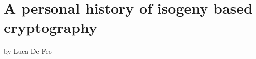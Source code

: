 \documentclass[10pt]{article}
\theoremstyle{plain}
\theoremstyle{definition}
\def\F{\ensuremath{\mathbb{F}}}
\newcommand{\bl}[1]{\textcolor{blue}{#1}}
\newcommand{\rd}[1]{\textcolor{red}{#1}}
\begin{document}
\begin{comment}
\begin{figure}
  \centering
  \begin{tabular}{l *{2}{p{32ex}<{\centering}}}
    \hline
    Public parameters & \multicolumn{2}{l}{Primes $ℓ_A,ℓ_B$, and a prime $p=ℓ_A^{e_A}ℓ_B^{e_B}f∓1$,}\\
                      & \multicolumn{2}{l}{A supersingular elliptic curve $E$ over $\F_{p^2}$ of order $(p±1)^2$,}\\
                      & \multicolumn{2}{l}{A basis $〈P_A,Q_A〉$ of $E[ℓ_A^{e_A}]$,}\\
                      & \multicolumn{2}{l}{A basis $〈P_B,Q_B〉$ of $E[ℓ_B^{e_B}]$,}\\
    \hline
                      & {\bf Alice} & {\bf Bob}\\
    \hline
    Pick random secret & $A=[m_A]P_A+[n_A]Q_A$ & $B=[m_B]P_B+[n_B]Q_B$\\[1ex]
    Compute secret isogeny & $α:E\to E_A=E/〈A〉$ & $β:E\to E_B=E/〈B〉$\\[1ex]
    Exchange data &  \hfill $E_A,α(P_B),α(Q_B) \longrightarrow$ & $\longleftarrow E_B,β(P_A),β(Q_A)$ \hfill\strut \\[1ex]
    Compute shared secret & $E/〈A,B〉 = E_B/〈β(A)〉$ & $E/〈A,B〉 = E_A/〈α(B)〉$
  \end{tabular}
  
  \caption{Supersingular Isogeny Diffie-Hellman key exchange protocol.}
  \label{fig:sidh-prot}
\end{figure}

\begin{figure}
  \centering
  \begin{tikzpicture}
    \node[matrix of nodes, ampersand replacement=\&, column sep=4mm, row sep=2cm] (diagram) {
      \& |(1)| $E$ \\
      |(a)| \parbox{1.5cm}{$E/〈\bl{A}〉$\\{\footnotesize $\bl{α}(P_B)\\\bl{α}(Q_B)$}} \& \&
      |(b)| \parbox{1.5cm}{$E/〈\rd{B}〉$\\{\footnotesize $\rd{β}(P_A)\\\rd{β}(Q_A)$}}\\
      \normalsize $\frac{E/〈\bl{A}〉}{\rd{α(B)}} \simeq$ \&
      |(ab)|  $E/〈\bl{A},\rd{B}〉$ \&
      \normalsize $\simeq \frac{E/〈\rd{B}〉}{\bl{β(A)}}$\\
    };
    \small
    \path[blue] (1) edge node[auto,swap](phia) {$α$} (a);
    \path[red] (1) edge node[auto](phib) {$β$} (b);
    \path[red] (a) edge node[auto,swap](psia){$β'$} (ab);
    \path[blue] (b) edge node[auto](psib){$α'$} (ab);
    \path[dashed,->] (phia) edge node[auto]{\footnotesize $\rd{α(B)}$} (psia);
    \path[dashed,->] (phib) edge node[auto,swap]{\footnotesize $\bl{β(A)}$} (psib);
  \end{tikzpicture}

  \caption{Schematics of SIDH key exchange. Quantities only known to
    Alice are drawn in blue, quantities only known to Bob in red.}
  \label{fig:sidh}
\end{figure}
\end{comment}



\clearpage
\part{A personal history of isogeny based cryptography}

by Luca De Feo
\end{document}
